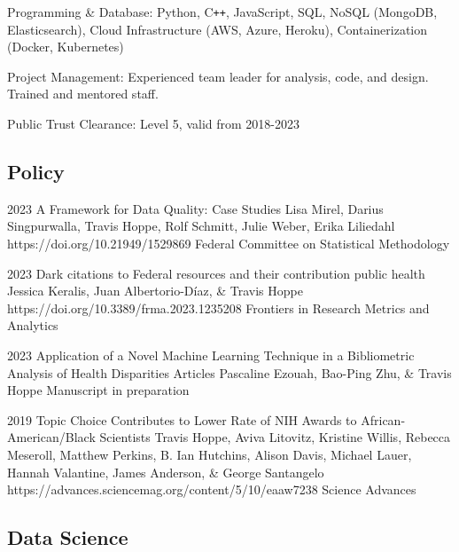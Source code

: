 \documentclass[]{scrartcl}
\begin{document}
\begin{cleanCV}
\WorkExperience
{ }
{Programming \& Database: }
{Python, C\texttt{++}, JavaScript, SQL, NoSQL (MongoDB, Elasticsearch), Cloud Infrastructure (AWS, Azure, Heroku), Containerization (Docker, Kubernetes)}

\WorkExperience
{ }
{Project Management: }
{Experienced team leader for analysis, code, and design. Trained and mentored staff.}

\WorkExperience
{ }
{Public Trust Clearance: }
{Level 5, valid from 2018-2023}



\vspace{-1em}

\subsection{Policy}

\Paper
{2023}
{A Framework for Data Quality: Case Studies}
{Lisa Mirel, Darius Singpurwalla, Travis Hoppe, Rolf Schmitt, Julie Weber, Erika Liliedahl}
{https://doi.org/10.21949/1529869}
{Federal Committee on Statistical Methodology}

\Paper
{2023}
{Dark citations to Federal resources and their contribution public health}
{Jessica Keralis, Juan Albertorio-Díaz, \& Travis Hoppe}
{https://doi.org/10.3389/frma.2023.1235208}
{Frontiers in Research Metrics and Analytics}

\Paper
{2023}
{Application of a Novel Machine Learning Technique in a Bibliometric Analysis of Health Disparities Articles}
{Pascaline Ezouah, Bao-Ping Zhu, \& Travis Hoppe}
{}{Manuscript in preparation}

\Paper
{2019}
{Topic Choice Contributes to Lower Rate of NIH Awards to African-American/Black Scientists}
{Travis Hoppe, Aviva Litovitz, Kristine Willis, Rebecca Meseroll, Matthew Perkins, B. Ian Hutchins, Alison Davis, Michael Lauer, Hannah Valantine, James Anderson, \& George Santangelo}
{https://advances.sciencemag.org/content/5/10/eaaw7238}
{Science Advances}


\subsection{Data Science}



\end{cleanCV}
\end{document}
